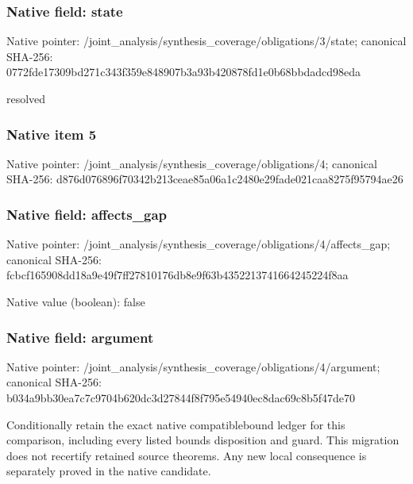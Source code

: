\documentclass[10pt,a4paper]{article}
\begin{document}
\subsubsection{Native field: state}


Native pointer: /joint\_analysis/synthesi\allowbreak{}s\_coverage/obligations/3\allowbreak{}/state; canonical SHA-256: 0772fde17309bd271c343f35\allowbreak{}9e848907b3a93b420878fd1e\allowbreak{}0b68bbdadcd98eda


resolved


\subsubsection{Native item 5}


Native pointer: /joint\_analysis/synthesi\allowbreak{}s\_coverage/obligations/4; canonical SHA-256: d876d076896f70342b213cea\allowbreak{}e85a06a1c2480e29fade021c\allowbreak{}aa8275f95794ae26



\subsubsection{Native field: affects\_gap}


Native pointer: /joint\_analysis/synthesi\allowbreak{}s\_coverage/obligations/4\allowbreak{}/affects\_gap; canonical SHA-256: fcbcf165908dd18a9e49f7ff\allowbreak{}27810176db8e9f63b4352213\allowbreak{}741664245224f8aa



Native value (boolean): false



\subsubsection{Native field: argument}


Native pointer: /joint\_analysis/synthesi\allowbreak{}s\_coverage/obligations/4\allowbreak{}/argument; canonical SHA-256: b034a9bb30ea7c7c9704b620\allowbreak{}dc3d27844f8f795e54940ec8\allowbreak{}dac69c8b5f47de70


Conditionally retain the exact native compatiblebound ledger for this comparison, including every listed bounds disposition and guard. This migration does not recertify retained source theorems. Any new local consequence is separately proved in the native candidate.
\end{document}
